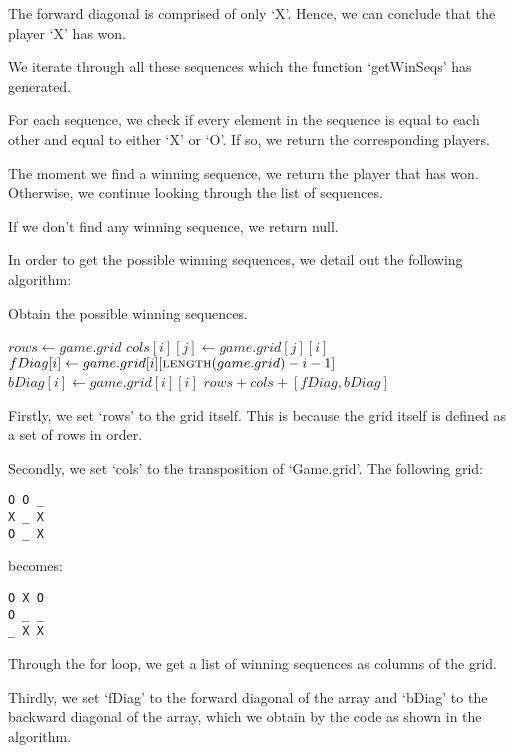 \documentclass{article}
\begin{document}
The forward diagonal is comprised of only `X'. Hence, we can conclude that the player `X' has won.

We iterate through all these sequences which the function `getWinSeqs' has generated.

For each sequence, we check if every element in the sequence is equal to each other and equal to either `X' or `O'. If so, we return the corresponding players.

The moment we find a winning sequence, we return the player that has won. Otherwise, we continue looking through the list of sequences.

If we don't find any winning sequence, we return null.

In order to get the possible winning sequences, we detail out the following algorithm:

\begin{algorithm}
\caption{Obtain the possible winning sequences.}

\begin{algorithmic}[1]
\State $rows \gets game.grid$
    \State $cols[i][j] \gets game.grid[j][i]$
  \EndFor
\EndFor
{}
  \State $fDiag[i] \gets game.grid[i][\Call{length}{game.grid} - i - 1]$
\EndFor
{}
  \State $bDiag[i] \gets game.grid[i][i]$
\EndFor
\Return $rows + cols + [fDiag, bDiag]$
\EndProcedure
\end{algorithmic}
\end{algorithm}

Firstly, we set `rows' to the grid itself. This is because the grid itself is defined as a set of rows in order.

Secondly, we set `cols' to the transposition of `Game.grid'. The following grid:

\begin{verbatim}
O O _
X _ X
O _ X
\end{verbatim}

becomes:

\begin{verbatim}
O X O
O _ _
_ X X
\end{verbatim}

Through the for loop, we get a list of winning sequences as columns of the grid.

Thirdly, we set `fDiag' to the forward diagonal of the array and `bDiag' to the backward diagonal of the array, which we obtain by the code as shown in the algorithm.
\end{document}
